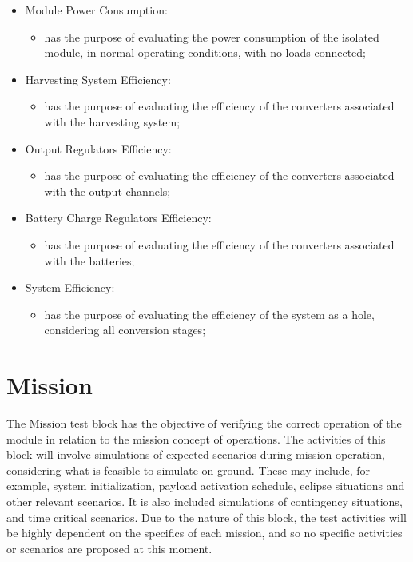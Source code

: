 \begin{itemize}
    \item Module Power Consumption:
    \begin{itemize}
        \item has the purpose of evaluating the power consumption of the isolated module, in normal operating conditions, with no loads connected;
    \end{itemize}

    \item Harvesting System Efficiency:
    \begin{itemize}
        \item has the purpose of evaluating the efficiency of the converters associated with the harvesting system;
    \end{itemize}

    \item Output Regulators Efficiency:
    \begin{itemize}
        \item has the purpose of evaluating the efficiency of the converters associated with the output channels;
    \end{itemize}

    \item Battery Charge Regulators Efficiency:
    \begin{itemize}
        \item has the purpose of evaluating the efficiency of the converters associated with the batteries;
    \end{itemize}

    \item System Efficiency:
    \begin{itemize}
        \item has the purpose of evaluating the efficiency of the system as a hole, considering all conversion stages;
    \end{itemize}

\end{itemize}



\section{Mission}

The Mission test block has the objective of verifying the correct operation of the module in relation to the mission concept of operations.
The activities of this block will involve simulations of expected scenarios during mission operation, considering what is feasible to simulate on ground.
These may include, for example, system initialization, payload activation schedule, eclipse situations and other relevant scenarios.
It is also included simulations of contingency situations, and time critical scenarios.
Due to the nature of this block, the test activities will be highly dependent on the specifics of each mission, and so no specific activities or scenarios are proposed at this moment.


